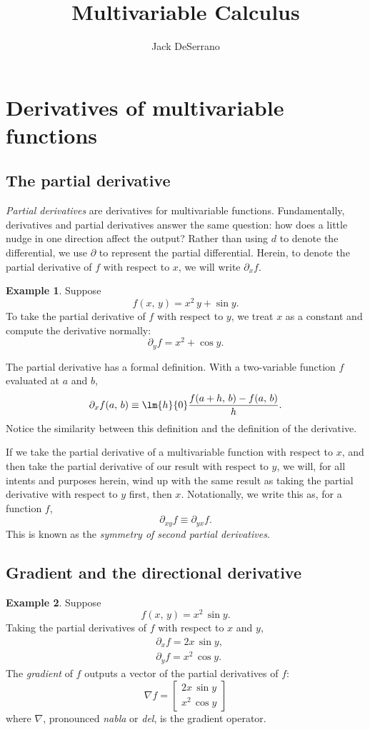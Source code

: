 \documentclass[11pt]{article}
\title{Multivariable Calculus}
\author{Jack DeSerrano}
\theoremstyle{definition}
\newtheorem{ex}{Example}[section]
\begin{document}
\maketitle
\tableofcontents

\section{Derivatives of multivariable functions}


\subsection{The partial derivative}
 \textit{Partial derivatives} are derivatives for multivariable functions. Fundamentally, derivatives and partial derivatives answer the same question: how does a little nudge in one direction affect the output? Rather than using $d$ to denote the differential, we use $\partial$ to represent the partial differential. Herein, to denote the partial derivative of $f$ with respect to $x$, we will write $ \partial_x f$. 
 
 
\begin{ex}Suppose
$$
f(x,\, y) = x^2\, y + \sin y.
$$
To take the partial derivative of $f$ with respect to $y$, we treat $x$ as a constant and compute the derivative normally:
$$
 \partial_y f = x^2 +\cos y.
$$\end{ex}

The partial derivative has a formal definition. With a two-variable function $f$ evaluated at $a$ and $b$,
$$
 \partial_x f (a,\, b) \equiv \lm{h}{0}\frac{f(a+h,\, b) - f(a,\, b)}{h}.
$$
Notice the similarity between this definition and the definition of the derivative.


If we take the partial derivative of a multivariable function with respect to $x$, and then take the partial derivative of our result with respect to $y$, we will, for all intents and purposes herein, wind up with the same result as taking the partial derivative with respect to $y$ first, then $x$. Notationally, we write this as, for a function $f$,
$$
 \partial_{xy}f \equiv  \partial_{yx}f.
$$
This is known as the \textit{symmetry of second partial derivatives}.




\subsection{Gradient and the directional derivative}
\begin{ex}Suppose
$$
f(x,\, y) = x^2\, \sin y.
$$
Taking the partial derivatives of $f$ with respect to $x$ and $y$,
$$
\begin{aligned}
& \partial_x f = 2x\,\sin y,\\
& \partial_y f = x^2\,\cos y.
\end{aligned}
$$
The \textit{gradient} of $f$ outputs a vector of the partial derivatives of $f$:
$$
\nabla f = \left[\begin{array}{c}2x\,\sin y \\x^2\,\cos y\end{array}\right]
$$
where $\nabla$, pronounced \textit{nabla} or \textit{del}, is the gradient operator. \end{ex}
\end{document}
